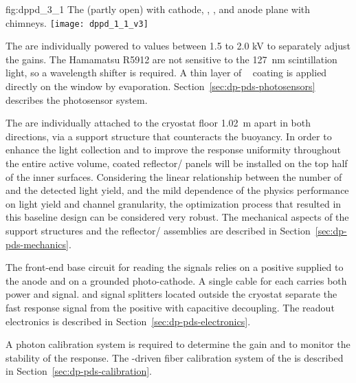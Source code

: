 \begin{dunefigure}{fig:dppd_3_1}
{The  (partly open) with cathode, , , and anode plane with chimneys.}
\texttt{[image: dppd\_1\_1\_v3]}
\end{dunefigure}

The  are individually powered to values between \num{1.5} to \num{2.0} \si{\kV} to separately adjust the  gains. The Hamamatsu R5912  are not sensitive to the \SI{127}{nm} scintillation light, so a wavelength shifter is required. A thin layer of ~\cite{Francini:2013lua} coating is applied directly on the  window by evaporation. Section~\ref{sec:dp-pds-photosensors} describes the photosensor system.

The \dpnumpmtch {} are individually attached to the cryostat floor \SI{1.02}{m} apart in both directions, via a  support structure that counteracts the  buoyancy. In order to enhance the light collection and to improve the  response uniformity throughout the entire  active volume,  coated reflector/ panels will be installed on the top half of the  inner surfaces. Considering the linear relationship between the number of  and the detected light yield, and the mild dependence of the  physics performance on light yield and channel granularity, the optimization process that resulted in this baseline design can be considered very robust. The mechanical aspects of the  support structures and the reflector/ assemblies are described in Section~\ref{sec:dp-pds-mechanics}.

The front-end  base circuit for reading the \phel signals relies on a positive  supplied to the  anode and on a grounded photo-cathode. A single cable for each  carries both power and signal.  and signal splitters located outside the cryostat separate the fast  response signal from the positive  with capacitive decoupling. The  readout electronics is described in Section~\ref{sec:dp-pds-electronics}.

A photon calibration system is required to determine the  gain and to monitor the stability of the  response. The -driven fiber calibration system of the  is described in Section~\ref{sec:dp-pds-calibration}. 

